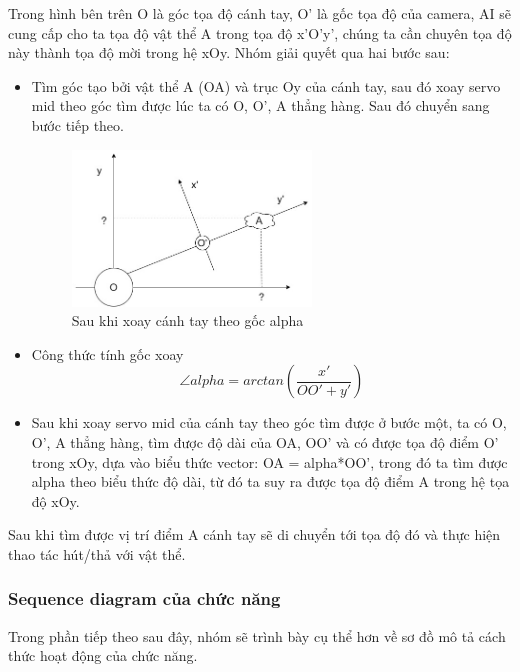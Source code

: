 Trong hình bên trên O là góc tọa độ cánh tay, O' là gốc tọa độ của camera, AI sẽ cung cấp cho ta tọa độ vật thể A trong tọa độ x'O'y', chúng ta cần chuyên tọa độ này thành tọa độ mời trong hệ xOy. Nhóm giải quyết qua hai bước sau:
\begin{itemize}
    \item Tìm góc tạo bởi vật thể A (OA) và trục Oy của cánh tay, sau đó xoay servo mid theo góc tìm được lúc ta có O, O', A thẳng hàng. Sau đó chuyển sang bước tiếp theo.
    
    \begin{figure}[!h]
        \centering
        \includegraphics[width=0.6\textwidth]{Images/Implementation/AI/AI_math_2.jpg}
        \caption{Sau khi xoay cánh tay theo gốc alpha}
    \end{figure}

    \item  Công thức tính gốc xoay \[\angle alpha = arctan( \frac{x'}{OO'+y'} ) \] 
     
    \item Sau khi xoay servo mid của cánh tay theo góc tìm được ở bước một, ta có O, O', A thẳng hàng, tìm được độ dài của OA, OO' và có được tọa độ điểm O' trong xOy, dựa vào biểu thức vector: OA = alpha*OO', trong đó ta tìm được alpha theo biểu thức độ dài, từ đó ta suy ra được tọa độ điểm A trong hệ tọa độ xOy.
\end{itemize}

Sau khi tìm được vị trí điểm A cánh tay sẽ di chuyển tới tọa độ đó và thực hiện thao tác hút/thả với vật thể.

\subsubsection{Sequence diagram của chức năng}

Trong phần tiếp theo sau đây, nhóm sẽ trình bày cụ thể hơn về sơ đồ mô tả cách thức hoạt động của chức năng.

